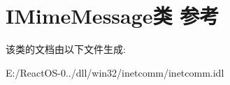 \hypertarget{class_i_mime_message}{}\section{I\+Mime\+Message类 参考}
\label{class_i_mime_message}


该类的文档由以下文件生成\+:\begin{DoxyCompactItemize}
\item 
E\+:/\+React\+O\+S-\/0../dll/win32/inetcomm/inetcomm.\+idl\end{DoxyCompactItemize}
